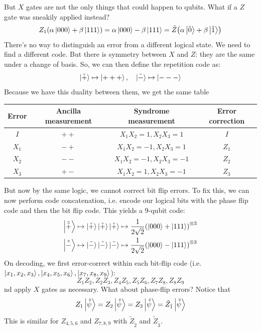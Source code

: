 But $X$ gates are not the only things that could happen to qubits. What if a $Z$ gate was sneakily applied instead?
\[ Z_1 (\alpha \ket{000} + \beta \ket{111}) = \alpha \ket{000} - \beta \ket{111} = \tilde{Z}\qty(\alpha \ket{\tilde{0}} + \beta \ket{\tilde{1}}) \]
There's no way to distinguish an error from a different logical state. We need to find a different code.
But there is symmetry between $X$ and $Z$: they are the same under a change of basis. So, we
can then define the repetition code as:
\[ \ket{\tilde{+}} \mapsto \ket{+++}, \quad \ket{\tilde{-}} \mapsto \ket{---} \]
Because we have this duality between them, we get the same table
\begin{center}
    \begin{tabular}{ | c | c | c | c | }
        Error & Ancilla measurement & Syndrome measurement & Error correction \\ \hline
        $I$ & $++$ & $X_1 X_2 = 1, X_2 X_3 = 1$ & $I$ \\ 
        $X_1$ & $-+$ & $X_1 X_2 = -1, X_2 X_3 = 1$ & $Z_1$ \\
        $X_2$ & $--$ & $X_1 X_2 = -1, X_2 X_3 = -1$ & $Z_2$ \\
        $X_3$ & $+-$ & $X_1 X_2 = 1, X_2 X_3 = -1$ & $Z_3$ \\
\end{tabular}
\end{center}
But now by the same logic, we cannot correct bit flip errors.
To fix this, we can now perform code concatenation, i.e. encode our logical bits with the phase flip code
and then the bit flip code. This yields a 9-qubit code:
\begin{align*}
    \ket{\tilde{\tilde{+}}} &\mapsto \ket{\tilde{+}} \ket{\tilde{+}} \ket{\tilde{+}} \mapsto \frac{1}{2\sqrt{2}}\qty(\ket{000} + \ket{111})^{\otimes 3} \\
    \ket{\tilde{\tilde{-}}} &\mapsto \ket{\tilde{-}} \ket{\tilde{-}} \ket{\tilde{-}} \mapsto \frac{1}{2\sqrt{2}}\qty(\ket{000} - \ket{111})^{\otimes 3}
\end{align*}
On decoding, we first error-correct within each bit-flip code (i.e. $\ket{x_1,x_2,x_3}, \ket{x_4,x_5,x_6}, \ket{x_7,x_8,x_9}$):
\[ Z_1 Z_2, Z_2 Z_3, Z_4 Z_5, Z_5 Z_6, Z_7 Z_8, Z_8 Z_9 \]
nd apply $X$ gates as necessary. What about phase-flip errors? Notice that
\[ Z_1 \ket{\tilde{\tilde{\psi}}} = Z_2 \ket{\tilde{\tilde{\psi}}} = Z_3 \ket{\tilde{\tilde{\psi}}} = \tilde{Z}_{\tilde{1}} \ket{\tilde{\tilde{\psi}}} \]
This is similar for $Z_{4,5,6}$ and $Z_{7,8,9}$ with $\tilde{Z}_{\tilde{2}}$ and $\tilde{Z}_{\tilde{3}}$.
